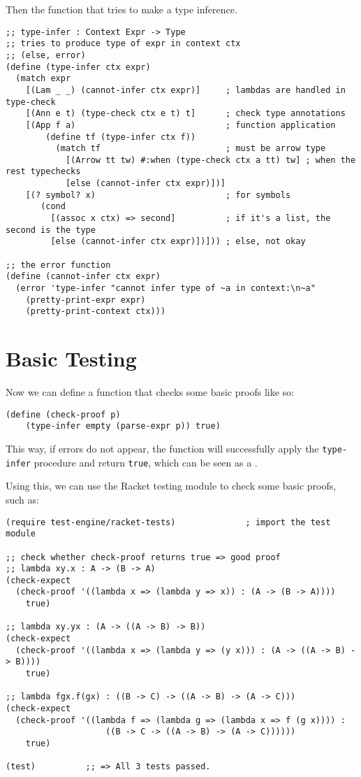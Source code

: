 Then the function that tries to make a type inference.
{
  \small
\begin{verbatim}
;; type-infer : Context Expr -> Type
;; tries to produce type of expr in context ctx
;; (else, error)
(define (type-infer ctx expr)
  (match expr
    [(Lam _ _) (cannot-infer ctx expr)]     ; lambdas are handled in type-check
    [(Ann e t) (type-check ctx e t) t]      ; check type annotations
    [(App f a)                              ; function application
        (define tf (type-infer ctx f))
          (match tf                         ; must be arrow type
            [(Arrow tt tw) #:when (type-check ctx a tt) tw] ; when the rest typechecks
            [else (cannot-infer ctx expr)])]
    [(? symbol? x)                          ; for symbols
       (cond
         [(assoc x ctx) => second]          ; if it's a list, the second is the type
         [else (cannot-infer ctx expr)])])) ; else, not okay

;; the error function
(define (cannot-infer ctx expr)
  (error 'type-infer "cannot infer type of ~a in context:\n~a"
    (pretty-print-expr expr)
    (pretty-print-context ctx)))
\end{verbatim}
}

\section{Basic Testing}

Now we can define a function that checks some basic proofs like so:
{
  \small
\begin{verbatim}
(define (check-proof p)
    (type-infer empty (parse-expr p)) true)
\end{verbatim}
}

This way, if errors do not appear, the function will successfully apply
the \texttt{type-infer} procedure and return \texttt{true}, which can be
seen as a .

Using this, we can use the Racket testing module to check some basic
proofs, such as:
{
  \small
\begin{verbatim}
(require test-engine/racket-tests)              ; import the test module

;; check whether check-proof returns true => good proof
;; lambda xy.x : A -> (B -> A)
(check-expect
  (check-proof '((lambda x => (lambda y => x)) : (A -> (B -> A))))
    true)

;; lambda xy.yx : (A -> ((A -> B) -> B))
(check-expect
  (check-proof '((lambda x => (lambda y => (y x))) : (A -> ((A -> B) -> B))))
    true)

;; lambda fgx.f(gx) : ((B -> C) -> ((A -> B) -> (A -> C)))
(check-expect
  (check-proof '((lambda f => (lambda g => (lambda x => f (g x)))) :
                    ((B -> C -> ((A -> B) -> (A -> C))))))
    true)

(test)          ;; => All 3 tests passed.
\end{verbatim}
}

